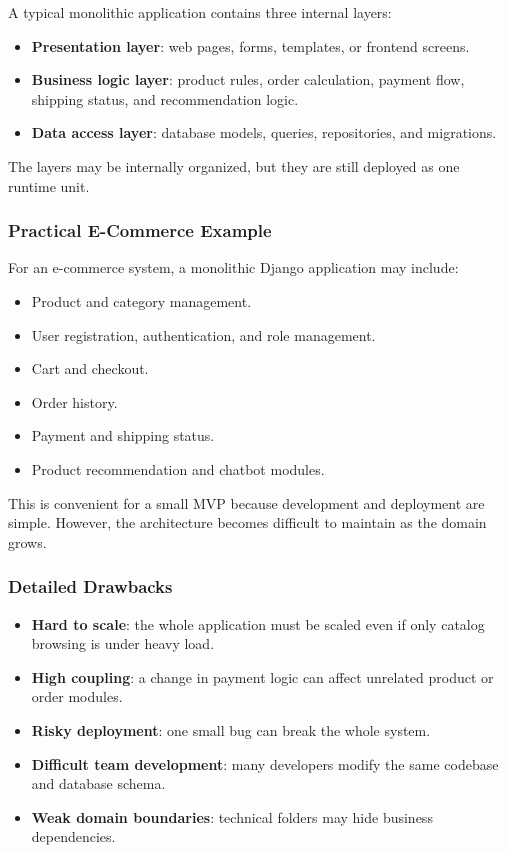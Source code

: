 \documentclass[12pt,a4paper]{article}
\begin{document}
A typical monolithic application contains three internal layers:

\begin{itemize}
    \item \textbf{Presentation layer}: web pages, forms, templates, or frontend screens.
    \item \textbf{Business logic layer}: product rules, order calculation, payment flow, shipping status, and recommendation logic.
    \item \textbf{Data access layer}: database models, queries, repositories, and migrations.
\end{itemize}

The layers may be internally organized, but they are still deployed as one runtime unit.

\subsubsection{Practical E-Commerce Example}

For an e-commerce system, a monolithic Django application may include:

\begin{itemize}
    \item Product and category management.
    \item User registration, authentication, and role management.
    \item Cart and checkout.
    \item Order history.
    \item Payment and shipping status.
    \item Product recommendation and chatbot modules.
\end{itemize}

This is convenient for a small MVP because development and deployment are simple. However, the architecture becomes difficult to maintain as the domain grows.

\subsubsection{Detailed Drawbacks}

\begin{itemize}
    \item \textbf{Hard to scale}: the whole application must be scaled even if only catalog browsing is under heavy load.
    \item \textbf{High coupling}: a change in payment logic can affect unrelated product or order modules.
    \item \textbf{Risky deployment}: one small bug can break the whole system.
    \item \textbf{Difficult team development}: many developers modify the same codebase and database schema.
    \item \textbf{Weak domain boundaries}: technical folders may hide business dependencies.
\end{itemize}
\end{document}
